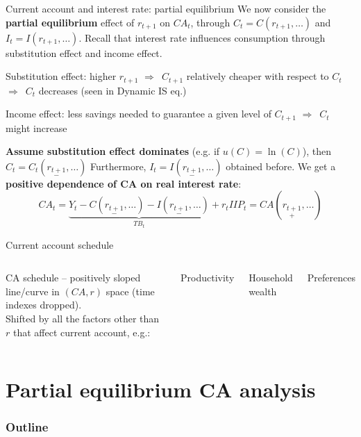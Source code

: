 \documentclass{beamer}
\newenvironment{mytemize}
{\vfill\itemize[nolistsep,itemsep=\fill,label=\color{blue}{$\triangleright$}]}
  {\enditemize}
\newenvironment{mynumerate}
{\vfill\enumerate[nolistsep,itemsep=\fill,label=\arabic*.]}
  {\endenumerate}
\newcommand{\rarr}{$\Rightarrow$\ }
\begin{document}
\begin{frame}{Current account and interest rate: partial equilibrium}
  We now consider the \textbf{partial equilibrium} effect of $r_{t+1}$ on $CA_t$, through $C_t = C(r_{t+1}, \dots)$ and $I_t = I(r_{t+1}, \dots)$.
  \vfill
  Recall that interest rate influences consumption through substitution effect and income effect.
  \begin{mynumerate}
  \item Substitution effect: higher $r_{t+1}$ \rarr $C_{t+1}$ relatively cheaper with respect to $C_t$ \rarr $C_t$ decreases (seen in Dynamic IS eq.)
  \item Income effect: less savings needed to guarantee a given level of $C_{t+1}$ \rarr $C_t$ might increase
  \end{mynumerate}

  \textbf{Assume substitution effect dominates} (e.g. if $u(C) = \ln(C)$), then $C_t = C_t(\underset{-}{r_{t+1}}, \dots)$
  \vfill 
  Furthermore, $I_t = I(\underset{-}{r_{t+1}}, \dots)$ obtained before. We get a \textbf{positive dependence of CA on real interest rate}:
  $$CA_t = \underbrace{Y_t - C(\underset{-}{r_{t+1}},\dots) - I(\underset{-}{r_{t+1}}, \dots)}_{TB_t} +  r_t IIP_t = CA(\underset{+}{r_{t+1}},\dots)$$
\end{frame}

\begin{frame}{Current account schedule}
  \begin{columns}
	 CA schedule -- positively sloped line/curve in $(CA, r)$ space (time indexes dropped).\\
	\vfill
  Shifted by all the factors other than $r$ that affect current account, e.g.:
  \begin{mytemize}
	\item Productivity 
	\item Household wealth 
	\item Preferences
  \end{mytemize}
  \end{columns}
  \end{frame}

\section{Partial equilibrium CA analysis} 
\begin{frame}
\frametitle{Outline}
\tableofcontents[currentsection]
\end{frame}
\end{document}
